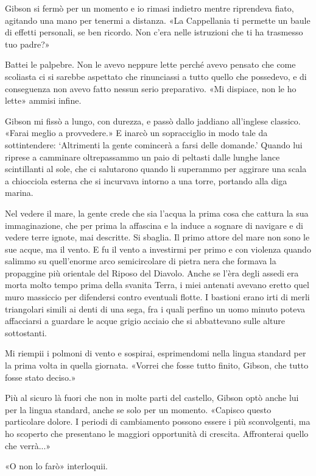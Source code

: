 Gibson si fermò per un momento e io rimasi indietro mentre riprendeva
fiato, agitando una mano per tenermi a distanza. «La Cappellania ti
permette un baule di effetti personali, se ben ricordo. Non c'era nelle
istruzioni che ti ha trasmesso tuo padre?»

Battei le palpebre. Non le avevo neppure lette perché avevo pensato che
come scoliasta ci si sarebbe aspettato che rinunciassi a tutto quello
che possedevo, e di conseguenza non avevo fatto nessun serio
preparativo. «Mi dispiace, non le ho lette» ammisi infine.

Gibson mi fissò a lungo, con durezza, e passò dallo jaddiano all'inglese
classico. «Farai meglio a provvedere.» E inarcò un sopracciglio in modo
tale da sottintendere: `Altrimenti la gente comincerà a farsi delle
domande.' Quando lui riprese a camminare oltrepassammo un paio di
peltasti dalle lunghe lance scintillanti al sole, che ci salutarono
quando li superammo per aggirare una scala a chiocciola esterna che si
incurvava intorno a una torre, portando alla diga marina.

Nel vedere il mare, la gente crede che sia l'acqua la prima cosa che
cattura la sua immaginazione, che per prima la affascina e la induce a
sognare di navigare e di vedere terre ignote, mai descritte. Si sbaglia.
Il primo attore del mare non sono le sue acque, ma il vento. E fu il
vento a investirmi per primo e con violenza quando salimmo su
quell'enorme arco semicircolare di pietra nera che formava la propaggine
più orientale del Riposo del Diavolo. Anche se l'èra degli assedi era
morta molto tempo prima della svanita Terra, i miei antenati avevano
eretto quel muro massiccio per difendersi contro eventuali flotte. I
bastioni erano irti di merli triangolari simili ai denti di una sega,
fra i quali perfino un uomo minuto poteva affacciarsi a guardare le
acque grigio acciaio che si abbattevano sulle alture sottostanti.

Mi riempii i polmoni di vento e sospirai, esprimendomi nella lingua
standard per la prima volta in quella giornata. «Vorrei che fosse tutto
finito, Gibson, che tutto fosse stato deciso.»

Più al sicuro là fuori che non in molte parti del castello, Gibson optò
anche lui per la lingua standard, anche se solo per un momento. «Capisco
questo particolare dolore. I periodi di cambiamento possono essere i più
sconvolgenti, ma ho scoperto che presentano le maggiori opportunità di
crescita. Affronterai quello che verrà...»

«O non lo farò» interloquii.

